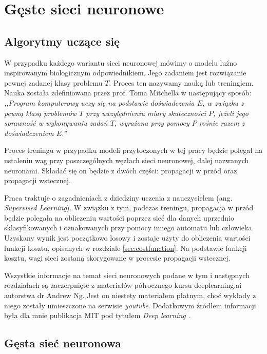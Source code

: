\chapter{Gęste sieci neuronowe}
\label{chap:siecifc}

\section{Algorytmy uczące się}

W przypadku każdego wariantu sieci neuronowej mówimy o modelu luźno inspirowanym biologicznym odpowiednikiem. Jego zadaniem jest rozwiązanie pewnej zadanej klasy problemu \(T\). Proces ten nazywamy nauką lub treningiem. Nauka została zdefiniowana przez prof. Toma Mitchella w następujący sposób:
\textit{,,Program komputerowy uczy się na podstawie doświadczenia \(E\), w związku z pewną klasą problemów \(T\) przy uwzględnieniu miary skuteczności \(P\), jeżeli jego sprawność w wykonywaniu zadań \(T\), wyrażona przy pomocy \(P\)
rośnie razem z doświadczeniem \(E\).''}

Proces treningu w przypadku modeli przytoczonych w tej pracy będzie polegał na ustaleniu wag przy poszczególnych węzłach sieci neuronowej, dalej nazwanych neuronami. Składać się on będzie z dwóch części: propagacji w przód oraz propagacji wstecznej. 

Praca traktuje o zagadnieniach z dziedziny uczenia z nauczycielem (ang. \textit{Supervised Learning}). W związku z tym, podczas treningu, propagacja w przód będzie polegała na obliczeniu wartości poprzez sieć dla danych uprzednio sklasyfikowanych i oznakowanych przy pomocy innego automatu lub człowieka.
Uzyskany wynik jest początkowo losowy i zostaje użyty do obliczenia wartości funkcji kosztu, opisanych w rozdziale \ref{sec:costfunction}.
Na podstawie funkcji kosztu, wagi sieci zostaną skorygowane w procesie propagacji wstecznej.

Wszystkie informacje na temat sieci neuronowych podane w tym i następnych rozdziałach są zaczerpnięte z materiałów półrocznego kursu deeplearning.ai \cite{deeplearningai} autorstwa dr Andrew Ng. Jest on niestety materiałem płatnym, choć wykłady z niego zostały umieszczone na serwisie \textit{youtube}. Dodatkowym źródłem informacji była dla mnie publikacja MIT pod tytułem \textit{Deep learning} \cite{deeplearningbook}.

\section{Gęsta sieć neuronowa}

